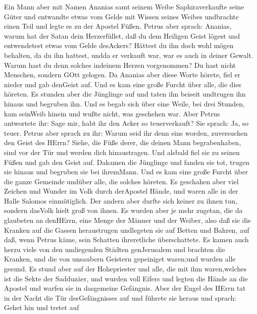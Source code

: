  Ein Mann aber mit Namen Ananias samt seinem Weibe
Saphiraverkaufte seine Güter  und entwandte etwas vom Gelde
mit Wissen seines Weibes undbrachte einen Teil und legte es zu der
Apostel Füßen.  Petrus aber sprach: Ananias, warum hat der
Satan dein Herzerfüllet, daß du dem Heiligen Geist lögest und
entwendetest etwas vom Gelde desAckers?  Hättest du ihn doch
wohl mögen behalten, da du ihn hattest, undda er verkauft war, war es
auch in deiner Gewalt. Warum hast du denn solches indeinem Herzen
vorgenommen? Du hast nicht Menschen, sondern GOtt gelogen. 
Da Ananias aber diese Worte hörete, fiel er nieder und gab denGeist auf.
Und es kam eine große Furcht über alle, die dies höreten. 
Es stunden aber die Jünglinge auf und taten ihn beiseit undtrugen ihn
hinaus und begruben ihn.  Und es begab sich über eine Weile,
bei drei Stunden, kam seinWeib hinein und wußte nicht, was geschehen
war.  Aber Petrus antwortete ihr: Sage mir, habt ihr den
Acker so teuerverkauft? Sie sprach: Ja, so teuer.  Petrus
aber sprach zu ihr: Warum seid ihr denn eins worden, zuversuchen den
Geist des HErrn? Siehe, die Füße derer, die deinen Mann begrabenhaben,
sind vor der Tür und werden dich hinaustragen.  Und alsbald
fiel sie zu seinen Füßen und gab den Geist auf. Dakamen die Jünglinge
und fanden sie tot, trugen sie hinaus und begruben sie bei ihremMann.
 Und es kam eine große Furcht über die ganze Gemeinde
undüber alle, die solches höreten.  Es geschahen aber viel
Zeichen und Wunder im Volk durch derApostel Hände, und waren alle in der
Halle Salomos einmütiglich.  Der andern aber durfte sich
keiner zu ihnen tun, sondern dasVolk hielt groß von ihnen. 
Es wurden aber je mehr zugetan, die da glaubeten an denHErrn, eine Menge
der Männer und der Weiber,  also daß sie die Kranken auf
die Gassen heraustrugen undlegeten sie auf Betten und Bahren, auf daß,
wenn Petrus käme, sein Schatten ihreretliche überschattete.
 Es kamen auch herzu viele von den umliegenden Städten
genJerusalem und brachten die Kranken, und die von unsaubern Geistern
gepeiniget waren;und wurden alle gesund.  Es stund aber auf
der Hohepriester und alle, die mit ihm waren,welches ist die Sekte der
Sadduzäer, und wurden voll Eifers  und legten die Hände an
die Apostel und warfen sie in dasgemeine Gefängnis.  Aber
der Engel des HErrn tat in der Nacht die Tür desGefängnisses auf und
führete sie heraus und sprach:  Gehet hin und tretet auf
